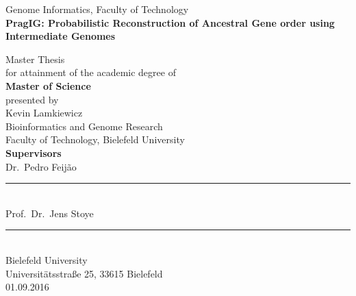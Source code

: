 
\begin{titlepage}
    \centering
    \vspace*{3cm}

    Genome Informatics, Faculty of Technology\\[10pt]
    {\Large\textbf{PragIG: Probabilistic Reconstruction of Ancestral Gene order using Intermediate Genomes}\\[40pt]}
      
    Master Thesis\\[6pt]
    for attainment of the academic degree of\\[6pt]
    {\Large\textbf{Master of Science}}\\[6pt]
    presented by\\
    Kevin Lamkiewicz\\
    {\small Bioinformatics and Genome Research\\
    Faculty of Technology, Bielefeld University}\\[40pt]
    
    \textbf{Supervisors}\\[10pt]
    Dr.~Pedro Feijão \\
    \rule{15em}{0.4pt}\\[1\baselineskip]
    Prof.~Dr.~Jens Stoye \\
    \rule{15em}{0.4pt}\\[1\baselineskip]
    \vspace{1\baselineskip}
    \vfill
    Bielefeld University\\
    Universitätsstraße 25, 33615 Bielefeld\\
    \vfill
    01.09.2016\par
    \vfill 
\end{titlepage}